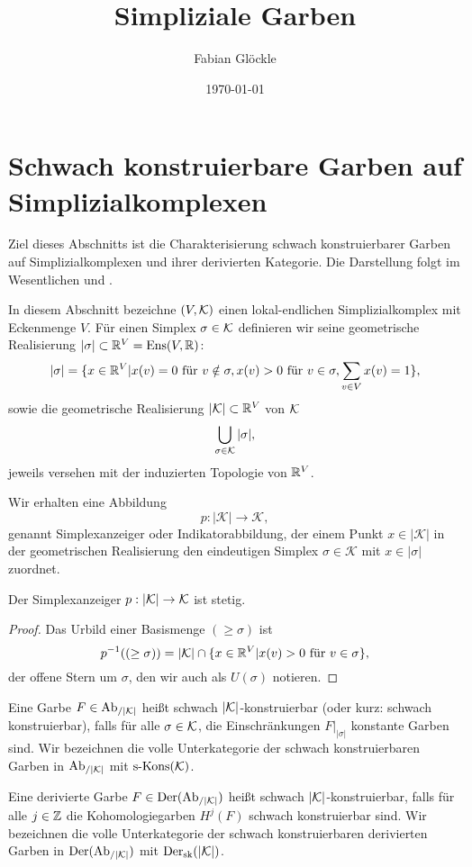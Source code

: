 



\title{Simpliziale Garben}
\author{Fabian Glöckle}
\date{\today}

\section{Schwach konstruierbare Garben auf Simplizialkomplexen}

Ziel dieses Abschnitts ist die Charakterisierung schwach
konstruierbarer Garben auf Simplizialkomplexen und ihrer derivierten
Kategorie. Die Darstellung folgt im Wesentlichen \cite{KS} und \cite{WS}.

In diesem Abschnitt bezeichne $(V, \mathcal{K})$ einen lokal-endlichen
Simplizialkomplex mit Eckenmenge $V$. Für einen Simplex $\sigma \in
\mathcal{K}$ definieren wir seine geometrische Realisierung $|\sigma| \subset
\mathbb{R}^V = \operatorname{Ens}(V, \mathbb{R})$:
\[ |\sigma| = \{ x \in \mathbb{R}^V | x(v) = 0 \text{ für } v \notin \sigma,
   x(v) > 0 \text{ für } v \in \sigma,
   \sum_{v \in V} x(v) = 1 \}, \]
sowie die geometrische Realisierung $|\mathcal{K}| \subset \mathbb{R}^V$ von $\mathcal{K}$
\[ \bigcup_{\sigma \in \mathcal{K}} |\sigma|, \]
jeweils versehen mit der induzierten Topologie von $\mathbb{R}^V$.

Wir erhalten eine Abbildung
\[ p: |\mathcal{K}| \to \mathcal{K}, \]
genannt Simplexanzeiger oder Indikatorabbildung, der einem Punkt $x
\in |\mathcal{K}|$ in der geometrischen Realisierung den eindeutigen
Simplex $\sigma \in \mathcal{K}$ mit $x \in |\sigma|$ zuordnet.

\begin{lemma}
  Der Simplexanzeiger $p: |\mathcal{K}| \to \mathcal{K}$ ist stetig.
\end{lemma}
\begin{proof}
  Das Urbild einer Basismenge $(\geq \sigma)$ ist
  \[ p^{-1}((\geq \sigma)) = |\mathcal{K}| \cap \{x \in \mathbb{R}^V | x(v) > 0 \text{ für }
  v \in \sigma \}, \]
  der offene Stern um $\sigma$, den wir auch als $U(\sigma)$ notieren.
\end{proof}


\begin{defn}
  Eine Garbe $F \in \operatorname{Ab}_{/|\mathcal{K}|}$ heißt schwach $|\mathcal{K}|$-konstruierbar (oder
  kurz: schwach konstruierbar), falls für alle $\sigma \in \mathcal{K}$, die
  Einschränkungen $F|_{|\sigma|}$ konstante Garben sind. Wir
  bezeichnen die volle Unterkategorie der schwach konstruierbaren
  Garben in $\operatorname{Ab}_{/|\mathcal{K}|}$ mit $\operatorname{s-Kons}(\mathcal{K})$.

  Eine derivierte Garbe $F \in \operatorname{Der}(\operatorname{Ab}_{/|\mathcal{K}|})$ heißt schwach
  $|\mathcal{K}|$-konstruierbar, falls für alle $j \in \mathbb{Z}$ die
  Kohomologiegarben $H^j(F)$ schwach konstruierbar sind. Wir
  bezeichnen die volle Unterkategorie der schwach konstruierbaren
  derivierten Garben in $\operatorname{Der}(\operatorname{Ab}_{/|\mathcal{K}|})$ mit $\operatorname{Der}_{\mathrm{sk}}(|\mathcal{K}|)$.
\end{defn}

